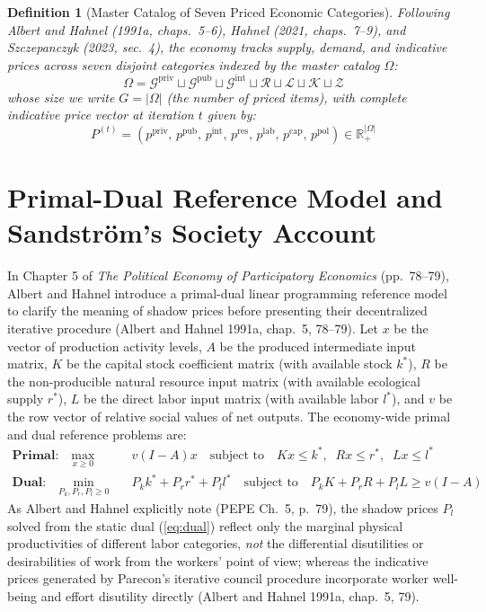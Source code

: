 \documentclass[10pt,twoside,openany]{book}
\theoremstyle{dpepstyle}
\newtheorem{definition}{Definition}[chapter]
\begin{document}
\begin{definition}[Master Catalog of Seven Priced Economic Categories]\label{def:catalog}
Following Albert and Hahnel (1991a, chaps.~5--6), Hahnel (2021, chaps.~7--9), and Szczepanczyk (2023, sec.~4), the economy tracks supply, demand, and indicative prices across seven disjoint categories indexed by the master catalog $\Omega$:
\begin{equation}
  \Omega = \mathcal{G}^{\text{priv}} \sqcup \mathcal{G}^{\text{pub}} \sqcup \mathcal{G}^{\text{int}} \sqcup \mathcal{R} \sqcup \mathcal{L} \sqcup \mathcal{K} \sqcup \mathcal{Z}
\end{equation}
whose size we write $G = |\Omega|$ (the number of priced items), with complete indicative price vector at iteration $t$ given by:
\begin{equation}
  P^{(t)} = \left(p^{\text{priv}}, \, p^{\text{pub}}, \, p^{\text{int}}, \, p^{\text{res}}, \, p^{\text{lab}}, \, p^{\text{cap}}, \, p^{\text{pol}}\right) \in \mathbb{R}_+^{|\Omega|}
\end{equation}
\end{definition}

\section{Primal-Dual Reference Model and Sandstr\"om's Society Account}
\label{sec:primal-dual}

In Chapter 5 of \emph{The Political Economy of Participatory Economics} (pp.~78--79), Albert and Hahnel introduce a primal-dual linear programming reference model to clarify the meaning of shadow prices before presenting their decentralized iterative procedure (Albert and Hahnel 1991a, chap.~5, 78--79). Let $x$ be the vector of production activity levels, $A$ be the produced intermediate input matrix, $K$ be the capital stock coefficient matrix (with available stock $k^*$), $R$ be the non-producible natural resource input matrix (with available ecological supply $r^*$), $L$ be the direct labor input matrix (with available labor $l^*$), and $v$ be the row vector of relative social values of net outputs. The economy-wide primal and dual reference problems are:
\begin{align}
  \textbf{Primal:} \quad \max_{x \ge 0} \quad & v(I - A)x \quad \text{subject to} \quad Kx \le k^*, \;\; Rx \le r^*, \;\; Lx \le l^* \label{eq:primal} \\
  \textbf{Dual:} \quad \min_{P_k, P_r, P_l \ge 0} \quad & P_k k^* + P_r r^* + P_l l^* \quad \text{subject to} \quad P_k K + P_r R + P_l L \ge v(I - A) \label{eq:dual}
\end{align}
As Albert and Hahnel explicitly note (PEPE Ch.~5, p.~79), the shadow prices $P_l$ solved from the static dual (\ref{eq:dual}) reflect only the marginal physical productivities of different labor categories, \emph{not} the differential disutilities or desirabilities of work from the workers' point of view; whereas the indicative prices generated by Parecon's iterative council procedure incorporate worker well-being and effort disutility directly (Albert and Hahnel 1991a, chap.~5, 79).
\end{document}
